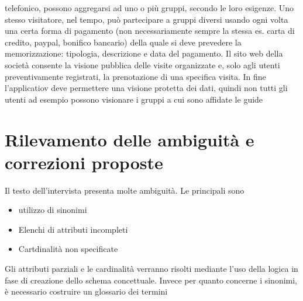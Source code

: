 \documentclass[a4paper,12pt]{report}
\begin{document}
telefonico,	 possono	 aggregarsi	 ad	 uno	 o	 più	 gruppi,	 secondo	 le	 loro	 esigenze.	 Uno	 stesso	
visitatore,	 nel	 tempo,	 può	 partecipare	 a	 gruppi	 diversi	 usando	 ogni	 volta	 una	 certa	 forma	 di	
pagamento	(non	necessariamente	sempre	la	stessa	es.	carta	di	credito,	paypal,	bonifico	bancario)	
della	quale	si	deve	prevedere	la	memorizzazione:	tipologia,	descrizione	e	data	del	pagamento.
Il	 sito	 web	 della	 società	 consente	 la	 visione	 pubblica	 delle	 visite	 organizzate	 e,	 solo	 agli	 utenti	
preventivamente	registrati,	la	prenotazione	di	una	specifica	visita. In fine l'applicatiov
deve permettere una visione protetta dei dati, quindi non tutti gli utenti ad esempio possono
visionare i gruppi a cui sono affidate le guide 

\section{Rilevamento delle ambiguità e correzioni proposte}
Il testo dell'intervista presenta molte ambiguità. Le principali sono
\begin{itemize}
    \item utilizzo di sinonimi
    \item Elenchi di attributi incompleti
    \item Cartdinalità non specificate
\end{itemize}

Gli attributi parziali e le cardinalità verranno risolti mediante l'uso della logica in fase di creazione dello schema concettuale.
Invece per quanto concerne i sinonimi, è necessario costruire un glossario dei termini
\end{document}
